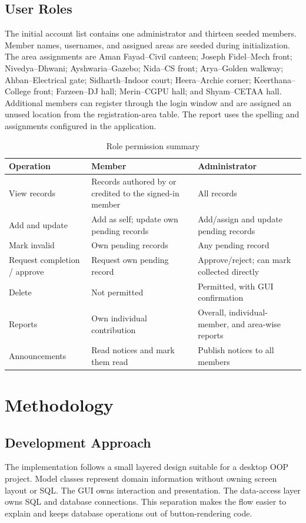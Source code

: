 \documentclass[12pt,a4paper]{report}
\begin{document}
\section{User Roles}
The initial account list contains one administrator and thirteen seeded members. Member names, usernames, and assigned areas are seeded during initialization. The area assignments are Aman Fayad--Civil canteen; Joseph Fidel--Mech front; Nivedya--Dhwani; Ayshwaria--Gazebo; Nida--CS front; Arya--Golden walkway; Ahban--Electrical gate; Sidharth--Indoor court; Heera--Archie corner; Keerthana--College front; Farzeen--DJ hall; Merin--CGPU hall; and Shyam--CETAA hall. Additional members can register through the login window and are assigned an unused location from the registration-area table. The report uses the spelling and assignments configured in the application.

\begin{table}[H]
\centering
\caption{Role permission summary}
\begin{tabular}{p{}p{}p{}}
\toprule
\textbf{Operation} & \textbf{Member} & \textbf{Administrator}\\
\midrule
View records & Records authored by or credited to the signed-in member & All records\\
Add and update & Add as self; update own pending records & Add/assign and update pending records\\
Mark invalid & Own pending records & Any pending record\\
Request completion / approve & Request own pending record & Approve/reject; can mark collected directly\\
Delete & Not permitted & Permitted, with GUI confirmation\\
Reports & Own individual contribution & Overall, individual-member, and area-wise reports\\
Announcements & Read notices and mark them read & Publish notices to all members\\
\bottomrule
\end{tabular}
\end{table}

\chapter{Methodology}
\section{Development Approach}
The implementation follows a small layered design suitable for a desktop OOP project. Model classes represent domain information without owning screen layout or SQL. The GUI owns interaction and presentation. The data-access layer owns SQL and database connections. This separation makes the flow easier to explain and keeps database operations out of button-rendering code.
\end{document}

